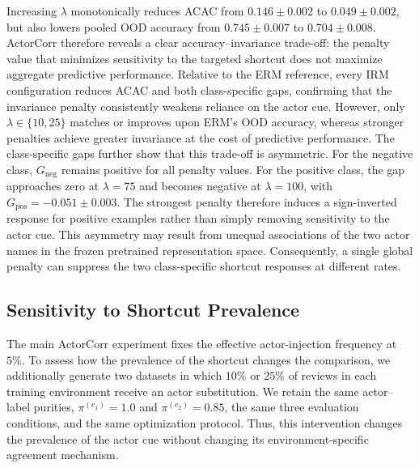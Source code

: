 \documentclass[11pt]{article}
\theoremstyle{definition}
\theoremstyle{plain}
\begin{document}
Increasing $\lambda$ monotonically reduces ACAC from $0.146 \pm 0.002$ to $0.049 \pm 0.002$, but also lowers pooled OOD accuracy from $0.745 \pm 0.007$ to $0.704 \pm 0.008$. ActorCorr therefore reveals a clear accuracy--invariance trade-off: the penalty value that minimizes sensitivity to the targeted shortcut does not maximize aggregate predictive performance. Relative to the ERM reference, every IRM configuration reduces ACAC and both class-specific gaps, confirming that the invariance penalty consistently weakens reliance on the actor cue. However, only $\lambda\in\{10,25\}$ matches or improves upon ERM's OOD accuracy, whereas stronger penalties achieve greater invariance at the cost of predictive performance. The class-specific gaps further show that this trade-off is asymmetric. For the negative class, $G_{\mathrm{neg}}$ remains positive for all penalty values. For the positive class, the gap approaches zero at $\lambda=75$ and becomes negative at $\lambda=100$, with $G_{\mathrm{pos}}=-0.051 \pm 0.003$. The strongest penalty therefore induces a sign-inverted response for positive examples rather than simply removing sensitivity to the actor cue. This asymmetry may result from unequal associations of the two actor names in the frozen pretrained representation space. Consequently, a single global penalty can suppress the two class-specific shortcut responses at different rates.



\subsection{Sensitivity to Shortcut Prevalence}
\label{app:actorcorr-frequency}

The main ActorCorr experiment fixes the effective actor-injection frequency at
$5\%$. To assess how the prevalence of the shortcut changes the comparison,
we additionally generate two datasets in which $10\%$ or $25\%$ of reviews in
each training environment receive an actor substitution. We retain the same
actor--label purities, $\pi^{(e_1)}=1.0$ and $\pi^{(e_2)}=0.85$, the same
three evaluation conditions, and the same optimization protocol. Thus, this
intervention changes the prevalence of the actor cue without changing its
environment-specific agreement mechanism.
\end{document}
